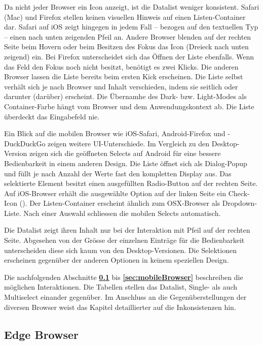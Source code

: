 Da nicht jeder Browser ein Icon anzeigt, ist die Datalist weniger konsistent. 
Safari (Mac) und Firefox stellen keinen visuellen Hinweis auf einen Listen-Container dar. 
Safari auf iOS zeigt hingegen in jedem Fall – bezogen auf den textuellen Typ – einen nach unten zeigenden Pfeil an. 
Andere Browser blenden auf der rechten Seite beim Hovern oder beim Besitzen des Fokus das Icon (Dreieck nach unten zeigend) ein. 
Bei Firefox unterscheidet sich das Öffnen der Liste ebenfalls. 
Wenn das Feld den Fokus noch nicht besitzt, benötigt es zwei Klicks. 
Die anderen Browser lassen die Liste bereits beim ersten Kick erscheinen. 
Die Liste selbst verhält sich je nach Browser und Inhalt verschieden, indem sie seitlich oder darunter (darüber) erscheint. 
Die Übernamhe des Dark- bzw. Light-Modes als Container-Farbe hängt vom Browser und dem Anwendungskontext ab. 
Die Liste überdeckt das Eingabefeld nie. 

Ein Blick auf die mobilen Browser wie iOS-Safari, Android-Firefox und -DuckDuckGo zeigen weitere UI-Unterschiede. 
Im Vergleich zu den Desktop-Version zeigen sich die geöffneten Selects auf Android für eine bessere Bedienbarkeit in einem anderen Design. 
Die Liste öffnet sich als Dialog-Popup und füllt je nach Anzahl der Werte fast den kompletten Display aus. 
Das selektierte Element besitzt einen ausgefüllten Radio-Button auf der rechten Seite. 
Auf iOS-Browser erhält die ausgewählte Option auf der linken Seite ein Check-Icon (\cmark). 
Der Listen-Container erscheint ähnlich zum OSX-Browser als Dropdown-Liste. 
Nach einer Auswahl schliessen die mobilen Selects automatisch. 

Die Datalist zeigt ihren Inhalt nur bei der Interaktion mit Pfeil auf der rechten Seite. 
Abgesehen von der Grösse der einzelnen Einträge für die Bedienbarkeit unterscheiden diese sich kaum von den Desktop-Versionen. 
Die Selektionen erscheinen gegenüber der anderen Optionen in keinem speziellen Design. 

Die nachfolgenden Abschnitte \textbf{\ref{sec:edgeBrowser}} bis \textbf{\ref{sec:mobileBrowser}} beschreiben die möglichen Interaktionen. 
Die Tabellen stellen das Datalist, Single- als auch Multiselect einander gegenüber. 
Im Anschluss an die Gegenüberstellungen der diversen Browser weist das Kapitel \textbf{} detaillierter auf die Inkonsistenzen hin. 


\clearpage
\subsection{Edge Browser}
\label{sec:edgeBrowser}

